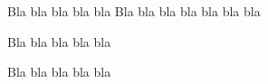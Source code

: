 Bla bla bla \cite{w} bla bla \cite{d}
Bla bla bla \cite{a} bla bla
\cite{a} bla bla \cite{r}

Bla bla bla \cite
{w} bla bla

Bla bla bla \cite {r} bla bla
